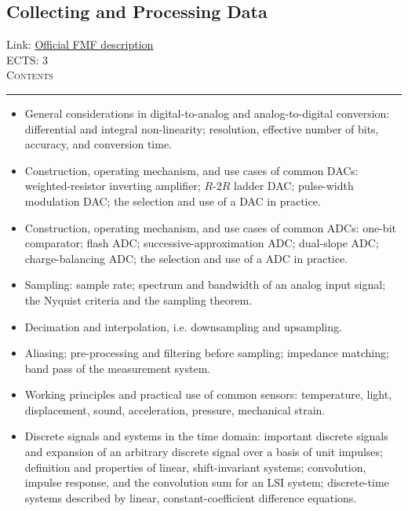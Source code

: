 \documentclass[11pt, a4paper]{article}
\newenvironment{course}[3]{
\subsection{#1}%
Link: \href{#2}{Official FMF description}\\%
ECTS: #3%
\vspace{1ex}
\\
{\large \textsc{Contents}}\\[-0.9ex]%
\rule{\textwidth}{0.5pt}
\vspace{-3ex}
}
{}
\newenvironment{chapter}[1]{
\begin{tcolorbox}[title=#1, breakable]
}
{\end{tcolorbox}}
\begin{document}
\begin{course}{Collecting and Processing Data}{https://www.fmf.uni-lj.si/en/study-physics/programmes/1fiz/2020/7000777/courses/1178/}{3}
\begin{chapter}{Analog-digital conversion}
\begin{itemize}
            \item General considerations in digital-to-analog and analog-to-digital conversion: differential and integral non-linearity; resolution, effective number of bits, accuracy, and conversion time.

            \item Construction, operating mechanism, and use cases of common DACs: weighted-resistor inverting amplifier; $ R $-$ 2R $ ladder DAC; pulse-width modulation DAC; the selection and use of a DAC in practice.

            \item Construction, operating mechanism, and use cases of common ADCs: one-bit comparator; flash ADC; successive-approximation ADC; dual-slope ADC; charge-balancing ADC; the selection and use of a ADC in practice.

        \end{itemize}
    \end{chapter}

    \begin{chapter}{Data acquisition}
        \begin{itemize}

            \item Sampling: sample rate; spectrum and bandwidth of an analog input signal; the Nyquist criteria and the sampling theorem.

            \item Decimation and interpolation, i.e. downsampling and upsampling.

            \item Aliasing; pre-processing and filtering before sampling; impedance matching; band pass of the measurement system.

            \item Working principles and practical use of common sensors: temperature, light, displacement, sound, acceleration, pressure, mechanical strain.
            
        \end{itemize}
    \end{chapter}

    \begin{chapter}{Digital signal processing}
        \begin{itemize}

            \item Discrete signals and systems in the time domain: important discrete signals and expansion of an arbitrary discrete signal over a basis of unit impulses; definition and properties of linear, shift-invariant systems; convolution, impulse response, and the convolution sum for an LSI system; discrete-time systems described by linear, constant-coefficient difference equations.


\end{itemize}
\end{chapter}
\end{course}
\end{document}
